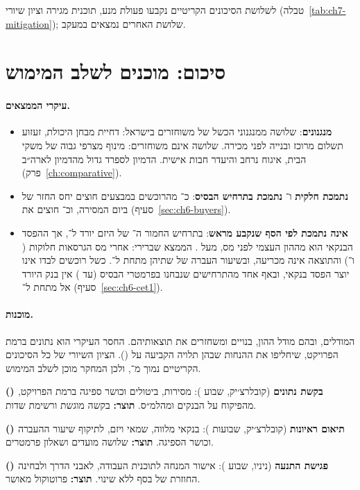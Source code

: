 \newpage
לשלושת הסיכונים הקריטיים נקבעו פעולת מנע, תוכנית מגירה וציון שיורי (טבלה~\ref{tab:ch7-mitigation}); שלושת האחרים נמצאים במעקב.
\newpage
\section{סיכום: מוכנים לשלב המימוש}
\label{sec:ch7-summary}

\paragraph{עיקרי הממצאים.}
\begin{itemize}
  \item \textbf{מנגנונים}: שלושה ממנגנוני הכשל של  משוחזרים בישראל: דחיית מבחן היכולת, זעזוע תשלום מרוכז ובנייה לפני מכירה. שלושה אינם משוחזרים: מינוף מצרפי גבוה של משקי הבית, איגוח נרחב והיעדר חבות אישית. הדמיון לספרד גדול מהדמיון לארה״ב (פרק~\ref{ch:comparative}).
  \item \textbf{ נתמכת חלקית} ו־\textbf{ נתמכת בתרחיש הבסיס}: כ־ מהרוכשים במבצעים חוצים יחס החזר של  ביום המסירה, וכ־ חוצים את  (סעיף~\ref{sec:ch6-buyers}).
  \item \textbf{ אינה נתמכת לפי הסף שנקבע מראש}: בתרחיש החמור ה־ של היזם יורד ל־, אך ההפסד הבנקאי הוא  מההון העצמי לפני מס, מעל . הממצא שברירי: אחרי מס הגרסאות חלוקות ( ו־) והתוצאה אינה מכריעה, ובשיעור העברה של  שתיהן מתחת ל־. כשל רוכשים לבדו אינו יוצר הפסד בנקאי, ובאף אחד מהתרחישים שנבחנו בפרמטרי הבסיס (עד ) אין בנק היורד אל מתחת ל־ (סעיף~\ref{sec:ch6-cet1}).
\end{itemize}

\paragraph{מוכנות.} המודלים, ובהם מודל ההון, בנויים ומשחזרים את תוצאותיהם. החסר העיקרי הוא נתונים ברמת הפרויקט, שיחליפו את ההנחות שבהן תלויה הקביעה על  (\mbox{}). הציון השיורי של כל הסיכונים הקריטיים נמוך מ־, ולכן המחקר מוכן לשלב המימוש.

\begin{keybox}
\textbf{() בקשת נתונים} (קובלרצ׳יק, שבוע ): מסירות, ביטולים וכושר ספיגה ברמת הפרויקט, מהפיקוח על הבנקים ומהלמ״ס. \textbf{תוצר:} בקשה מוגשת ורשימת שדות.\par
\textbf{() תיאום ראיונות} (קובלרצ׳יק, שבועות ): בנקאי מלווה, שמאי ויזם, לתיקוף שיעור ההעברה וכושר הספיגה. \textbf{תוצר:} שלושה מועדים ושאלון פרמטרים.\par
\textbf{() פגישת התנעה} (ניניו, שבוע ): אישור המנחה לתוכנית העבודה, לאבני הדרך ולבחינה החוזרת של  בסף  ללא שינוי. \textbf{תוצר:} פרוטוקול מאושר.
\end{keybox}

